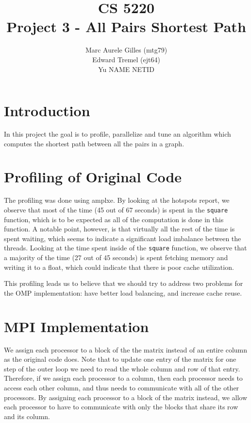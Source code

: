 \documentclass[11pt]{article}
\begin{document}
\title{CS 5220\\ Project 3 - All Pairs Shortest Path}
\author{Marc Aurele Gilles (mtg79)\\ Edward Tremel (ejt64) \\ Yu NAME NETID}
\maketitle

\section{Introduction}
In this project the goal is to profile, parallelize and tune an algorithm which computes the shortest path between all the pairs in a graph.


\section{Profiling of Original Code}
The profiling was done using amplxe. By looking at the hotspots report, we observe that most of the time (45 out of 67 seconds) is spent in the \texttt{square} function, which is to be expected as all of the computation is done in this function. A notable point, however, is that virtually all the rest of the time is spent waiting, which seems to indicate a significant load imbalance between the threads.
Looking at the time spent inside of the \texttt{square} function, we observe that a majority of the time (27 out of 45 seconds) is spent fetching memory and writing it to a float, which could indicate that there is poor cache utilization.

This profiling leads us to believe that we should try to address two problems for the OMP implementation: have better load balancing, and increase cache reuse.


 

\section{MPI Implementation}
We assign each processor to a block of the the matrix instead of an entire column as the original code does.
Note that to update one entry of the matrix for one step of the outer loop we need to read the whole column and row of that entry. Therefore, if we assign each processor to a column, then each processor needs to access each other column, and thus needs to communicate with all of the other processors. By assigning each processor to a block of the matrix instead, we allow each processor to have to communicate with only the blocks that share its row and its column.
\end{document}
